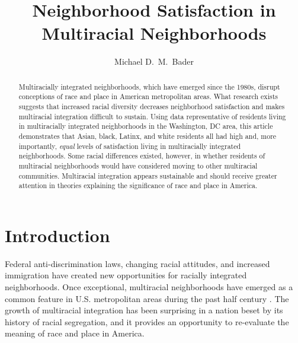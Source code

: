 \documentclass{baderart}
\title{Neighborhood Satisfaction in Multiracial Neighborhoods}
\author{Michael D.\ M.\ Bader}
\begin{document}
\maketitle

\begin{abstract}
Multiracially integrated neighborhoods, which have emerged since the 1980s, disrupt conceptions of race and place in American metropolitan areas. What research exists suggests that increased racial diversity decreases neighborhood satisfaction and makes multiracial integration difficult to sustain. Using data representative of residents living in multiracially integrated neighborhoods in the Washington, DC area, this article demonstrates that Asian, black, Latinx, and white residents all had high and, more importantly, \emph{equal} levels of satisfaction living in multiracially integrated neighborhoods. Some racial differences existed, however, in whether residents of multiracial neighborhoods would have considered moving to other multiracial communities. Multiracial integration appears sustainable and should receive greater attention in theories explaining the significance of race and place in America. 

\end{abstract}

\doublespace

\section{Introduction}\label{introduction}
Federal anti-discrimination laws, changing racial attitudes, and increased immigration have created new opportunities for racially integrated neighborhoods. Once exceptional, multiracial neighborhoods have emerged as a common feature in U.S. metropolitan areas during the past half century \citep{nyden_neighborhood_1998, logan_global_2010, holloway_racially_2012}. The growth of multiracial integration has been surprising in a nation beset by its history of racial segregation, and it provides an opportunity to re-evaluate the meaning of race and place in America.
\end{document}
